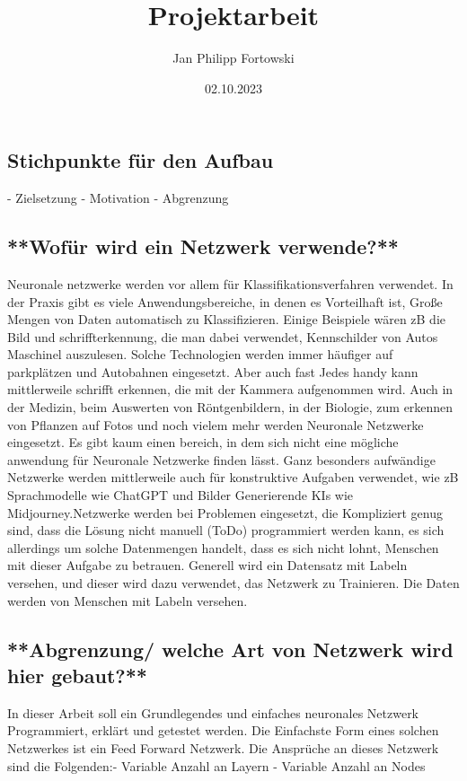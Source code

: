 \documentclass[12pt]{article}
\title{\textbf{Projektarbeit}}
\author{Jan Philipp Fortowski}
\date{02.10.2023}
\begin{document}
\maketitle
\tableofcontents
\thispagestyle{empty}

\subsection{ Stichpunkte für den Aufbau}
- Zielsetzung
- Motivation
- Abgrenzung\subsection{ **Wofür wird ein Netzwerk verwende?**}Neuronale netzwerke werden vor allem für Klassifikationsverfahren verwendet. In der Praxis gibt es viele Anwendungsbereiche, in denen es Vorteilhaft ist, Große Mengen von Daten automatisch zu Klassifizieren. Einige Beispiele wären zB die Bild und schriffterkennung, die man dabei verwendet, Kennschilder von Autos Maschinel auszulesen. Solche Technologien werden immer häufiger auf parkplätzen und Autobahnen eingesetzt. Aber auch fast Jedes handy kann mittlerweile schrifft erkennen, die mit der Kammera aufgenommen wird. Auch in der Medizin, beim Auswerten von Röntgenbildern, in der Biologie, zum erkennen von Pflanzen auf Fotos und noch vielem mehr werden Neuronale Netzwerke eingesetzt.  
Es gibt kaum einen bereich, in dem sich nicht eine mögliche anwendung für Neuronale Netzwerke finden lässt. Ganz besonders aufwändige Netzwerke werden mittlerweile auch für konstruktive Aufgaben verwendet, wie zB Sprachmodelle wie ChatGPT und Bilder Generierende KIs wie Midjourney.Netzwerke werden bei Problemen eingesetzt, die Kompliziert genug sind, dass die Lösung nicht manuell (ToDo) programmiert werden kann, es sich allerdings um solche Datenmengen handelt, dass es sich nicht lohnt, Menschen mit dieser Aufgabe zu betrauen.  
Generell wird ein Datensatz mit Labeln versehen, und dieser wird dazu verwendet, das Netzwerk zu Trainieren. Die Daten werden von Menschen mit Labeln versehen.\subsection{ **Abgrenzung/ welche Art von Netzwerk wird hier gebaut?**}In dieser Arbeit soll ein Grundlegendes und einfaches neuronales Netzwerk Programmiert, erklärt und getestet werden. Die Einfachste Form eines solchen Netzwerkes ist ein Feed Forward Netzwerk.  
Die Ansprüche an dieses Netzwerk sind die Folgenden:- Variable Anzahl an Layern
- Variable Anzahl an Nodes
\end{document}
